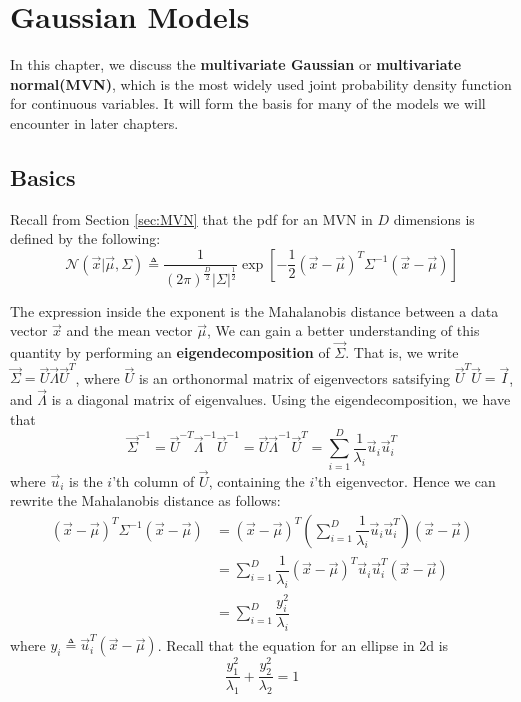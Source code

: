 \chapter{Gaussian Models}
\label{chap:MVN}

In this chapter, we discuss the \textbf{multivariate Gaussian} or \textbf{multivariate normal(MVN)}, which is the most widely used joint probability density function for continuous variables. It will form the basis for many of the models we will encounter in later chapters.


\section{Basics}
Recall from Section \ref{sec:MVN} that the pdf for an MVN in $D$ dimensions is defined by the following:
\begin{equation}
\mathcal{N}(\vec{x}|\vec{\mu},\Sigma) \triangleq \dfrac{1}{(2\pi)^{\frac{D}{2}}|\Sigma|^{\frac{1}{2}}}\exp\left[-\dfrac{1}{2}(\vec{x}-\vec{\mu})^T\Sigma^{-1}(\vec{x}-\vec{\mu})\right]
\end{equation}

The expression inside the exponent is the Mahalanobis distance between a data vector $\vec{x}$ and the mean vector $\vec{\mu}$, We can gain a better understanding of this quantity by performing an \textbf{eigendecomposition} of $\vec{\Sigma}$. That is, we write $\vec{\Sigma}=\vec{U}\vec{\Lambda}\vec{U}^T$, where $\vec{U}$ is an orthonormal matrix of eigenvectors satsifying $\vec{U}^T\vec{U}=\vec{I}$, and $\vec{\Lambda}$ is a diagonal matrix of eigenvalues. Using the eigendecomposition, we have that
\begin{equation}
\vec{\Sigma}^{-1}=\vec{U}^{-T}\vec{\Lambda}^{-1}\vec{U}^{-1}=\vec{U}\vec{\Lambda}^{-1}\vec{U}^T=\sum\limits_{i=1}^D \dfrac{1}{\lambda_i}\vec{u}_i\vec{u}_i^T
\end{equation}
where $\vec{u}_i$ is the $i$'th column of $\vec{U}$, containing the $i$'th eigenvector. Hence we can rewrite the Mahalanobis distance as follows:
\begin{align}
(\vec{x}-\vec{\mu})^T\Sigma^{-1}(\vec{x}-\vec{\mu}) & =(\vec{x}-\vec{\mu})^T\left(\sum\limits_{i=1}^D \dfrac{1}{\lambda_i}\vec{u}_i\vec{u}_i^T\right)(\vec{x}-\vec{\mu}) \\
    & =\sum\limits_{i=1}^D \dfrac{1}{\lambda_i}(\vec{x}-\vec{\mu})^T\vec{u}_i\vec{u}_i^T(\vec{x}-\vec{\mu}) \\
	& =\sum\limits_{i=1}^D \dfrac{y_i^2}{\lambda_i}
\end{align}
where $y_i \triangleq \vec{u}_i^T(\vec{x}-\vec{\mu})$. Recall that the equation for an ellipse in 2d is
\begin{equation}
\dfrac{y_1^2}{\lambda_1}+\dfrac{y_2^2}{\lambda_2}=1
\end{equation}

